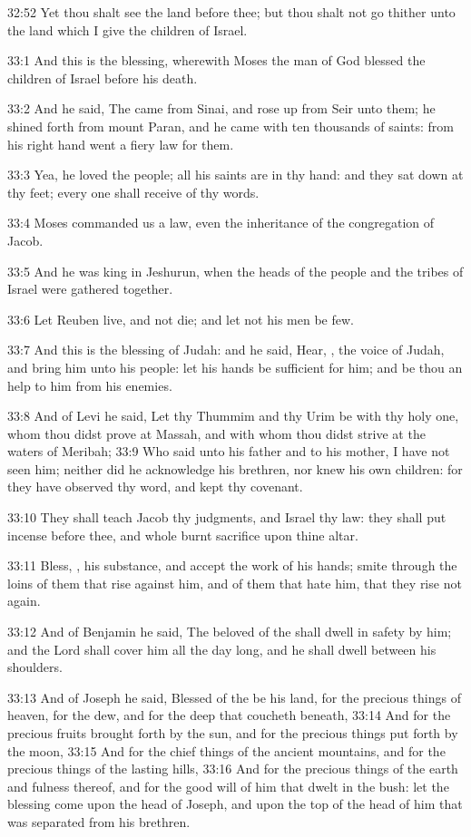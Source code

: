 32:52 Yet thou shalt see the land before thee; but thou shalt not go
thither unto the land which I give the children of Israel.

33:1 And this is the blessing, wherewith Moses the man of God blessed
the children of Israel before his death.

33:2 And he said, The \LORD came from Sinai, and rose up from Seir unto
them; he shined forth from mount Paran, and he came with ten thousands
of saints: from his right hand went a fiery law for them.

33:3 Yea, he loved the people; all his saints are in thy hand: and
they sat down at thy feet; every one shall receive of thy words.

33:4 Moses commanded us a law, even the inheritance of the
congregation of Jacob.

33:5 And he was king in Jeshurun, when the heads of the people and the
tribes of Israel were gathered together.

33:6 Let Reuben live, and not die; and let not his men be few.

33:7 And this is the blessing of Judah: and he said, Hear, \LORD, the
voice of Judah, and bring him unto his people: let his hands be
sufficient for him; and be thou an help to him from his enemies.

33:8 And of Levi he said, Let thy Thummim and thy Urim be with thy
holy one, whom thou didst prove at Massah, and with whom thou didst
strive at the waters of Meribah; 33:9 Who said unto his father and to
his mother, I have not seen him; neither did he acknowledge his
brethren, nor knew his own children: for they have observed thy word,
and kept thy covenant.

33:10 They shall teach Jacob thy judgments, and Israel thy law: they
shall put incense before thee, and whole burnt sacrifice upon thine
altar.

33:11 Bless, \LORD, his substance, and accept the work of his hands;
smite through the loins of them that rise against him, and of them
that hate him, that they rise not again.

33:12 And of Benjamin he said, The beloved of the \LORD shall dwell in
safety by him; and the Lord shall cover him all the day long, and he
shall dwell between his shoulders.

33:13 And of Joseph he said, Blessed of the \LORD be his land, for the
precious things of heaven, for the dew, and for the deep that coucheth
beneath, 33:14 And for the precious fruits brought forth by the sun,
and for the precious things put forth by the moon, 33:15 And for the
chief things of the ancient mountains, and for the precious things of
the lasting hills, 33:16 And for the precious things of the earth and
fulness thereof, and for the good will of him that dwelt in the bush:
let the blessing come upon the head of Joseph, and upon the top of the
head of him that was separated from his brethren.

